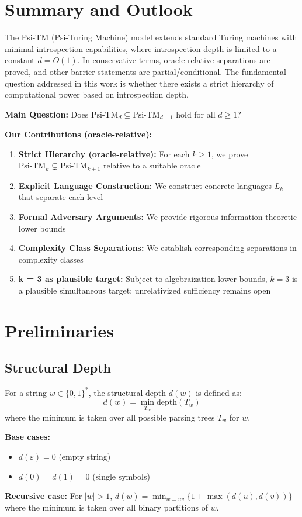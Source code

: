 
\section{Summary and Outlook}

The Psi-TM (Psi-Turing Machine) model extends standard Turing machines with minimal introspection capabilities, where introspection depth is limited to a constant $d = O(1)$. In conservative terms, oracle-relative separations are proved, and other barrier statements are partial/conditional. The fundamental question addressed in this work is whether there exists a strict hierarchy of computational power based on introspection depth.

\textbf{Main Question:} Does $\text{Psi-TM}_d \subsetneq \text{Psi-TM}_{d+1}$ hold for all $d \geq 1$?

\textbf{Our Contributions (oracle-relative):}
\begin{enumerate}
\item \textbf{Strict Hierarchy (oracle-relative):} For each $k \geq 1$, we prove $\text{Psi-TM}_k \subsetneq \text{Psi-TM}_{k+1}$ relative to a suitable oracle
\item \textbf{Explicit Language Construction:} We construct concrete languages $L_k$ that separate each level
\item \textbf{Formal Adversary Arguments:} We provide rigorous information-theoretic lower bounds
\item \textbf{Complexity Class Separations:} We establish corresponding separations in complexity classes
\item \textbf{k = 3 as plausible target:} Subject to algebraization lower bounds, $k=3$ is a plausible simultaneous target; unrelativized sufficiency remains open
\end{enumerate}

\section{Preliminaries}

\subsection{Structural Depth}

\begin{definition}
For a string $w \in \{0,1\}^*$, the structural depth $d(w)$ is defined as:
$$d(w) = \min_{T_w} \text{depth}(T_w)$$
where the minimum is taken over all possible parsing trees $T_w$ for $w$.

\textbf{Base cases:}
\begin{itemize}
\item $d(\varepsilon) = 0$ (empty string)
\item $d(0) = d(1) = 0$ (single symbols)
\end{itemize}

\textbf{Recursive case:}
For $|w| > 1$, $d(w) = \min_{w=uv} \{1 + \max(d(u), d(v))\}$ where the minimum is taken over all binary partitions of $w$.
\end{definition}

